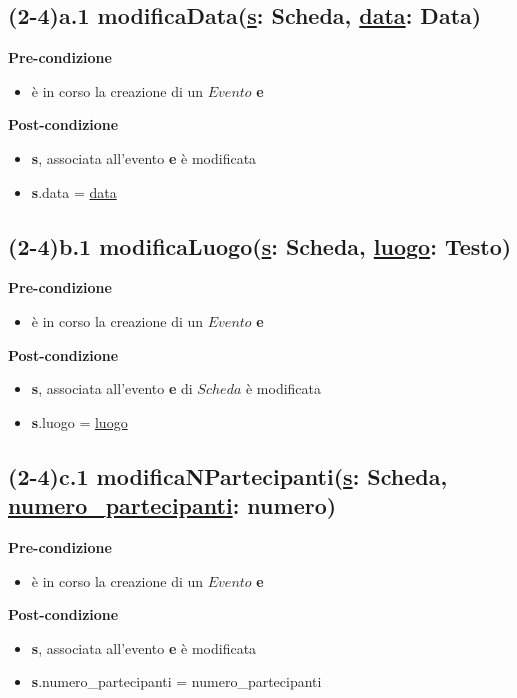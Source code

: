 \documentclass[12pt]{extarticle}
\begin{document}
\subsection*{(2-4)a.1 modificaData(\underline{s}: Scheda, \underline{data}: Data)}

\textbf{Pre-condizione}
\begin{itemize}
  \item è in corso la creazione di un $Evento$ \textbf{e}
\end{itemize} 
\textbf{Post-condizione}
\begin{itemize}
  \item \textbf{s}, associata all'evento \textbf{e} è modificata
  \item \textbf{s}.data = \underline{data} 
\end{itemize} 

\subsection*{(2-4)b.1 modificaLuogo(\underline{s}: Scheda, \underline{luogo}: Testo)}

\textbf{Pre-condizione}
\begin{itemize}
  \item è in corso la creazione di un $Evento$ \textbf{e}
\end{itemize} 
\textbf{Post-condizione}
\begin{itemize}
  \item \textbf{s}, associata all'evento \textbf{e} di $Scheda$ è modificata
  \item \textbf{s}.luogo = \underline{luogo} 
\end{itemize} 


\subsection*{(2-4)c.1 modificaNPartecipanti(\underline{s}: Scheda, \underline{numero\_partecipanti}: numero)}
\textbf{Pre-condizione}
\begin{itemize}
  \item è in corso la creazione di un $Evento$ \textbf{e}
\end{itemize} 
\textbf{Post-condizione}
\begin{itemize}
  \item \textbf{s}, associata all'evento \textbf{e} è modificata
  \item \textbf{s}.numero\_partecipanti = numero\_partecipanti
\end{itemize}
\end{document}
